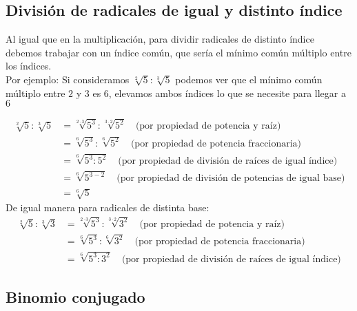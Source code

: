 \documentclass[a4paper]{article}
\begin{document}
\subsection{División de radicales de igual y distinto índice}
Al igual que en la multiplicación, para dividir radicales de distinto índice debemos trabajar con un índice común, que sería el mínimo común múltiplo entre los índices.\\
Por ejemplo: Si consideramos $\sqrt[2]{5} : \sqrt[3]{5}$ podemos ver que el mínimo común múltiplo entre $2$ y $3$ es $6$, elevamos ambos índices lo que se necesite para llegar a $6$ 

\begin{align*}
    \sqrt[2]{5} : \sqrt[3]{5} &= \sqrt[2\cdot 3]{5^3} : \sqrt[3\cdot 2]{5^2} \quad \text{(por propiedad de potencia y raíz)}\\
    &= \sqrt[6]{5^3} : \sqrt[6]{5^2} \quad \text{(por propiedad de potencia fraccionaria)}\\   
    &= \sqrt[6]{5^3:5^2} \quad \text{(por propiedad de división de raíces de igual índice)}\\
    &= \sqrt[6]{5^{3-2}} \quad \text{(por propiedad de división de potencias de igual base)}\\
    &= \sqrt[6]{5}
\end{align*}
De igual manera para radicales de distinta base:
\begin{align*}
    \sqrt[2]{5} : \sqrt[3]{3} &= \sqrt[2\cdot 3]{5^3} : \sqrt[3\cdot 2]{3^2} \quad \text{(por propiedad de potencia y raíz)}\\
    &= \sqrt[6]{5^3} : \sqrt[6]{3^2} \quad \text{(por propiedad de potencia fraccionaria)}\\   
    &= \sqrt[6]{5^3:3^2} \quad \text{(por propiedad de división de raíces de igual índice)}
\end{align*}
\subsection{Binomio conjugado}
\end{document}
